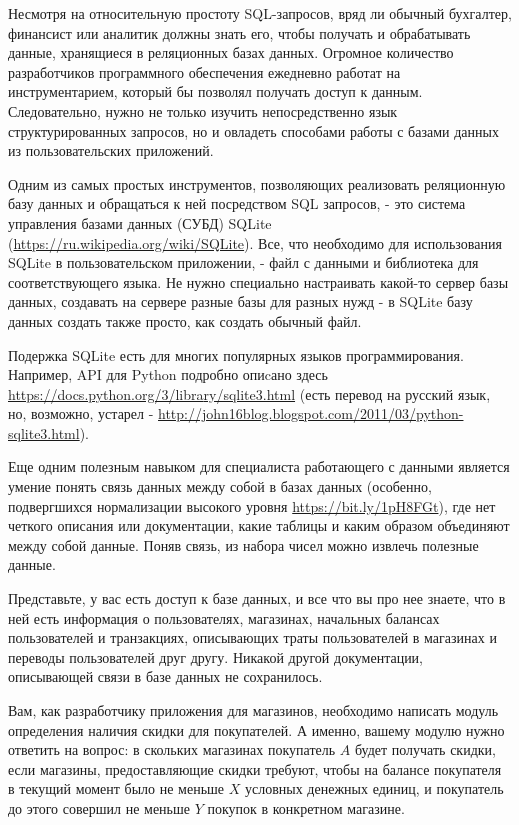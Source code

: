 
Несмотря на относительную простоту SQL-запросов, вряд ли обычный бухгалтер, финансист или аналитик должны знать его, чтобы получать и обрабатывать данные, хранящиеся в реляционных базах данных. Огромное количество разработчиков программного обеспечения ежедневно работат на инструментарием, который бы позволял получать доступ к данным. Следовательно, нужно не только изучить непосредственно язык структурированных запросов, но и овладеть способами работы с базами данных из пользовательских приложений.

Одним из самых простых инструментов, позволяющих реализовать реляционную базу данных и обращаться к ней посредством SQL запросов, - это система управления базами данных (СУБД) SQLite (\url{https://ru.wikipedia.org/wiki/SQLite}). Все, что необходимо для использования SQLite в пользовательском приложении, - файл с данными и библиотека для соответствующего языка. Не нужно специально настраивать какой-то сервер базы данных, создавать на сервере разные базы для разных нужд - в SQLite базу данных создать также просто, как создать обычный файл.

Подержка SQLite есть для многих популярных языков программирования. Например, API для Python подробно опиcано здесь \url{https://docs.python.org/3/libra}\linebreak \url{ry/sqlite3.html} (есть перевод на русский язык, но, возможно, устарел - \url{http://john16blog.blogspot.com/2011/03/python-sqlite3.html}). 

Еще одним полезным навыком для специалиста работающего с данными является умение понять связь данных между собой в базах данных (особенно, подвергшихся нормализации высокого уровня \url{https://bit.ly/1pH8FGt}), где нет четкого описания или документации, какие таблицы и каким образом объединяют между собой данные. Поняв связь, из набора чисел можно извлечь полезные данные. 

Представьте, у вас есть доступ к базе данных, и все что вы про нее знаете, что в ней есть информация о пользователях, магазинах, начальных балансах пользователей и транзакциях, описывающих траты пользователей в магазинах и переводы пользователей друг другу. Никакой другой документации, описывающей связи в базе данных не сохранилось.

Вам, как разработчику приложения для магазинов, необходимо написать модуль определения наличия скидки для покупателей. А именно, вашему модулю нужно ответить на вопрос: в скольких магазинах покупатель $A$ будет получать скидки, если магазины, предоставляющие скидки требуют, чтобы на балансе покупателя в текущий момент было не меньше $X$ условных денежных единиц, и покупатель до этого совершил не меньше $Y$ покупок в конкретном магазине.

